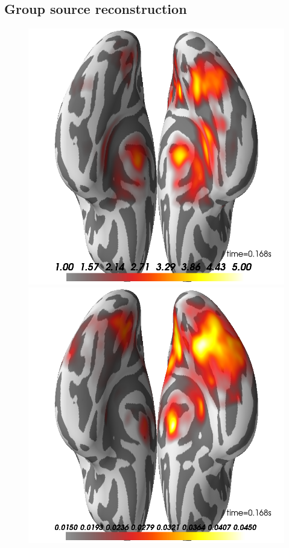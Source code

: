 \subsection{Group source reconstruction}

\begin{figure}
\centering
\begin{minipage}{0.4\linewidth}
\includegraphics[width=\linewidth]{figures/dspm-ave_highpass-NoneHz.png}
\end{minipage}
\begin{minipage}{0.4\linewidth}
\includegraphics[width=\linewidth]{figures/lcmv-ave_highpass-NoneHz.png}

\end{minipage}
\end{figure}
